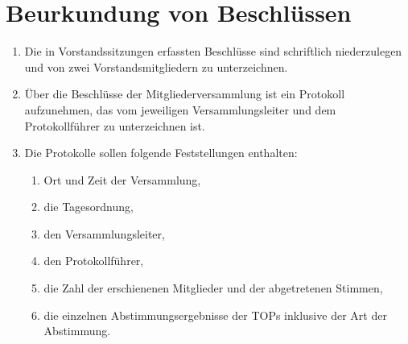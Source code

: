 \documentclass[a4paper,ngerman]{scrartcl}
\begin{document}
\section{Beurkundung von Beschlüssen}
\begin{enumerate}
\item Die in Vorstandssitzungen erfassten Beschlüsse sind schriftlich niederzulegen und von zwei Vorstandsmitgliedern zu unterzeichnen.
\item Über die Beschlüsse der Mitgliederversammlung ist ein Protokoll aufzunehmen, das vom jeweiligen Versammlungsleiter und dem Protokollführer zu unterzeichnen ist. 
\item Die Protokolle sollen folgende Feststellungen enthalten:
\begin{enumerate}
\item Ort und Zeit der Versammlung,
\item die Tagesordnung,
\item den Versammlungsleiter,
\item den Protokollführer,
\item die Zahl der erschienenen Mitglieder und der abgetretenen Stimmen,
\item die einzelnen Abstimmungsergebnisse der TOPs inklusive der Art der Abstimmung.
\end{enumerate}
\end{enumerate}
\end{document}
